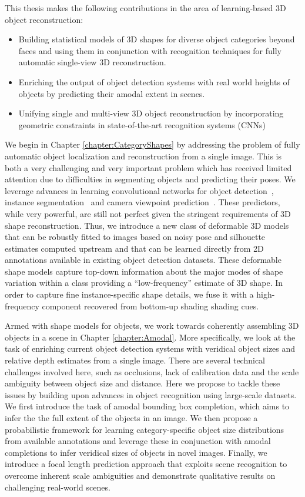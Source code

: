 \documentclass[../thesis.tex]{subfiles}
\begin{document}
This thesis makes the following contributions in the area of learning-based 3D object reconstruction:
\begin{itemize}
    \item Building statistical models of 3D shapes for diverse object categories beyond faces and using them in conjunction with recognition techniques for fully automatic single-view 3D reconstruction.
    \item Enriching the output of object detection systems with real world heights of objects by predicting their amodal extent in scenes.
    \item Unifying single and multi-view 3D object reconstruction by incorporating geometric constraints in state-of-the-art recognition systems (CNNs)
\end{itemize} 

We begin in Chapter \ref{chapter:CategoryShapes} by addressing the problem of fully automatic object localization and reconstruction from a single image. This is both a very challenging and very important problem which has received limited attention due to difficulties in segmenting objects and predicting their poses. We leverage advances in learning convolutional networks for object detection~\cite{girshick2013rich}, instance segmentation~\cite{BharathCVPR2015} and camera viewpoint prediction~\cite{ShubhamPose}. These predictors, while very powerful, are still not perfect given the stringent requirements of 3D shape reconstruction. Thus, we introduce a new class of deformable 3D models that can be robustly fitted to images based on noisy pose and silhouette estimates computed upstream and that can be learned directly from 2D annotations available in existing object detection datasets. These deformable shape models capture top-down information about the major modes of shape variation within a class providing a ``low-frequency'' estimate of 3D shape. In order to capture fine instance-specific shape details, we fuse it with a high-frequency component recovered from bottom-up shading shading cues.

Armed with shape models for objects, we work towards coherently assembling 3D objects in a scene in Chapter \ref{chapter:Amodal}. More specifically, we look at the task of enriching current object detection systems with veridical object sizes and relative depth estimates from a single image. There are several technical challenges involved here, such as occlusions, lack of calibration data and the scale ambiguity between object size and distance. Here we propose to tackle these issues by building upon advances in object recognition using large-scale datasets. We first introduce the task of amodal bounding box completion, which aims to infer the the full extent of the objects in an image. We then propose a probabilistic framework for learning category-specific object size distributions from available annotations and leverage these in conjunction with amodal completions to infer veridical sizes of objects in novel images. Finally, we introduce a focal length prediction approach that exploits scene recognition to overcome inherent scale ambiguities and demonstrate qualitative results on challenging real-world scenes.
\end{document}

